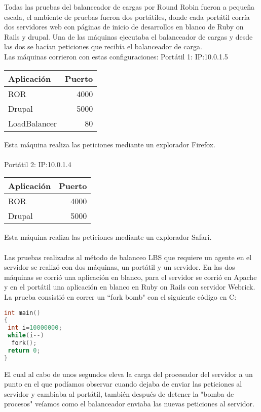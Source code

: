 Todas las pruebas del balanceador de cargas por Round Robin fueron a pequeña escala, el ambiente de pruebas fueron dos portátiles, donde cada
portátil corría dos servidores web con páginas de inicio de desarrollos en blanco de Ruby on Rails y drupal. Una de las máquinas ejecutaba el
balanceador de cargas y desde las dos se hacían peticiones que recibía el balanceador de carga.\\

Las máquinas corrieron con estas configuraciones:
Portátil 1: IP:10.0.1.5
\begin{center}
\begin{tabular}{ l r }
Aplicación & Puerto \\ \hline
ROR &  4000 \\
Drupal  & 5000\\
LoadBalancer & 80 \\
\end{tabular}
\end{center}
Esta máquina realiza las peticiones mediante un explorador Firefox.\\ \\

Portátil 2: IP:10.0.1.4
\begin{center}
\begin{tabular}{ l r }
Aplicación & Puerto \\ \hline
ROR  & 4000 \\
Drupal  & 5000\\
\end{tabular}
\end{center}
Esta máquina realiza las peticiones mediante un explorador Safari.\\ \\



Las pruebas realizadas al método de balanceo LBS que requiere un agente en el servidor se realizó con dos máquinas, un portátil y un servidor.
En las dos máquinas se corrió una aplicación en blanco, para el servidor se corrió en Apache y en el portátil una aplicación en blanco en Ruby on Rails
con servidor Webrick.\\
La prueba consistió en correr un ``fork bomb" con el siguiente código en C:

\begin{lstlisting}[language=C]
int main()
{
 int i=10000000;
 while(i--)
  fork();
 return 0;
}
\end{lstlisting}

El cual al cabo de unos segundos eleva la carga del procesador del servidor a un punto en el que podíamos observar cuando dejaba de enviar las
peticiones al servidor y cambiaba al portátil, también después de detener la "bomba de procesos" veíamos como el balanceador enviaba las nuevas peticiones al servidor.